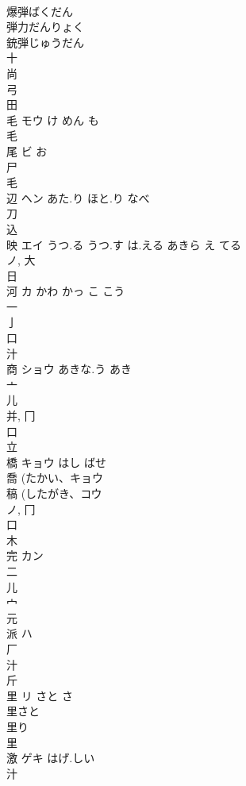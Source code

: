 \documentclass[8pt]{extreport}
\begin{document}
\begin{CJK}{UTF8}{min}
\\	爆弾ばくだん
\\	弾力だんりょく
\\	銃弾じゅうだん
\\	十 
\\	尚 
\\	弓 
\\	田 
\\	毛	モウ	け めん も	
\\	毛 
\\	尾	ビ	お	
\\	尸 
\\	毛 
\\	辺	ヘン	あた.り ほと.り なべ	
\\	刀 
\\	込 
\\	映	エイ	うつ.る うつ.す は.える あきら え てる	
\\	ノ, 大 
\\	日 
\\	河	カ	かわ かっ こ こう	
\\	一 
\\	亅 
\\	口 
\\	汁 
\\	商	ショウ	あきな.う あき	
\\	亠 
\\	儿 
\\	并, 冂 
\\	口 
\\	立 
\\	橋	キョウ	はし ばせ	
\\	喬 (たかい、キョウ 
\\	稿 (したがき、コウ 
\\	ノ, 冂 
\\	口 
\\	木 
\\	完	カン		
\\	二 
\\	儿 
\\	宀 
\\	元 
\\	派	ハ		
\\	厂 
\\	汁 
\\	斤 
\\	里	リ	さと さ	
\\	里さと 
\\	里り 
\\	里 
\\	激	ゲキ	はげ.しい	
\\	汁 

\end{CJK}
\end{document}
